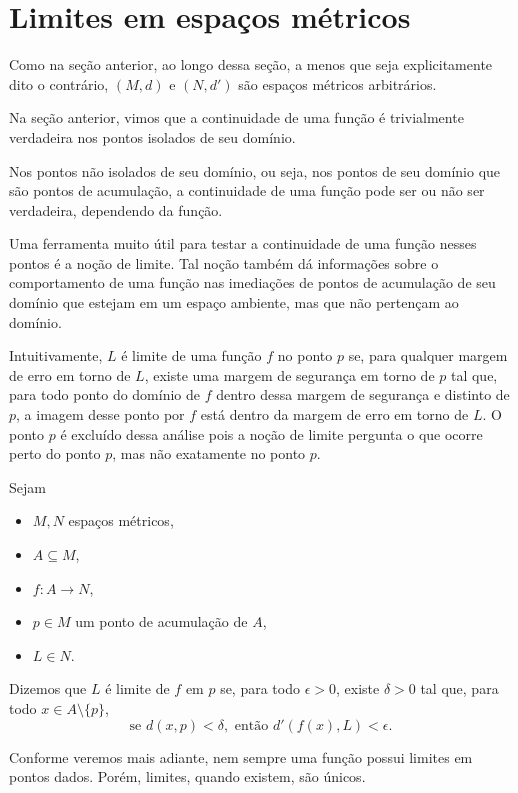 \section{Limites em espaços métricos}

Como na seção anterior, ao longo dessa seção, a menos que seja explicitamente dito o contrário, $(M, d)$ e $(N, d')$ são espaços métricos arbitrários.

Na seção anterior, vimos que a continuidade de uma função é trivialmente verdadeira nos pontos isolados de seu domínio.

Nos pontos não isolados de seu domínio, ou seja, nos pontos de seu domínio que são pontos de acumulação, a continuidade de uma função pode ser ou não ser verdadeira, dependendo da função.

Uma ferramenta muito útil para testar a continuidade de uma função nesses pontos é a noção de limite.
Tal noção também dá informações sobre o comportamento de uma função nas imediações de pontos de acumulação de seu domínio que estejam em um espaço ambiente, mas que não pertençam ao domínio.

Intuitivamente, $L$ é limite de uma função $f$ no ponto $p$ se, para qualquer margem de erro em torno de $L$, existe uma margem de segurança em torno de $p$ tal que, para todo ponto do domínio de $f$ dentro dessa margem de segurança e distinto de $p$, a imagem desse ponto por $f$ está dentro da margem de erro em torno de $L$.
O ponto $p$ é excluído dessa análise pois a noção de limite pergunta o que ocorre perto do ponto $p$, mas não exatamente no ponto $p$.

\begin{definition}
    Sejam
    \begin{itemize}
        \item $M, N$ espaços métricos,
        \item $A\subseteq M$,
        \item $f: A \to N$,
        \item $p \in M$ um ponto de acumulação de $A$,
        \item $L \in N$.
    \end{itemize}
    Dizemos que $L$ é limite de $f$ em $p$ se, para todo $\epsilon > 0$, existe $\delta > 0$ tal que, para todo $x \in A\setminus\{p\}$,
    \[
        \text{se } d(x, p) < \delta, \text{ então } d'(f(x), L) < \epsilon.
    \]
\end{definition}


Conforme veremos mais adiante, nem sempre uma função possui limites em pontos dados.
Porém, limites, quando existem, são únicos.


